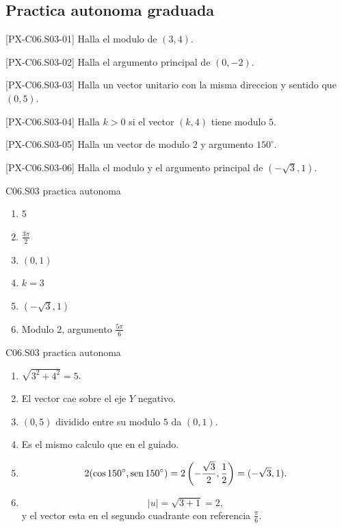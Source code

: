 \subsection*{Practica autonoma graduada}
\begin{exercise}{[PX-C06.S03-01] Halla el modulo de \((3,4)\).}
\end{exercise}
\begin{exercise}{[PX-C06.S03-02] Halla el argumento principal de \((0,-2)\).}
\end{exercise}
\begin{exercise}{[PX-C06.S03-03] Halla un vector unitario con la misma direccion y sentido que \((0,5)\).}
\end{exercise}
\begin{exercise}{[PX-C06.S03-04] Halla \(k>0\) si el vector \((k,4)\) tiene modulo \(5\).}
\end{exercise}
\begin{exercise}{[PX-C06.S03-05] Halla un vector de modulo \(2\) y argumento \(150^\circ\).}
\end{exercise}
\begin{exercise}{[PX-C06.S03-06] Halla el modulo y el argumento principal de \((-\sqrt{3},1)\).}
\end{exercise}

\begin{shortanswer}{C06.S03 practica autonoma}
\begin{enumerate}[label=\textbf{PX-C06.S03-\arabic*:}, leftmargin=*]
  \item \(5\)
  \item \(\frac{3\pi}{2}\)
  \item \((0,1)\)
  \item \(k=3\)
  \item \((-\sqrt{3},1)\)
  \item Modulo \(2\), argumento \(\frac{5\pi}{6}\)
\end{enumerate}
\end{shortanswer}

\begin{fullsolution}{C06.S03 practica autonoma}
\begin{enumerate}[label=\textbf{PX-C06.S03-\arabic*:}, leftmargin=*]
  \item \(\sqrt{3^2+4^2}=5\).
  \item El vector cae sobre el eje \(Y\) negativo.
  \item \((0,5)\) dividido entre su modulo \(5\) da \((0,1)\).
  \item Es el mismo calculo que en el guiado.
  \item
  \[
  2(\cos 150^\circ,\operatorname{sen} 150^\circ)=2\left(-\frac{\sqrt{3}}{2},\frac{1}{2}\right)=(-\sqrt{3},1).
  \]
  \item
  \[
  |u|=\sqrt{3+1}=2,
  \]
  y el vector esta en el segundo cuadrante con referencia \(\frac{\pi}{6}\).
\end{enumerate}
\end{fullsolution}

